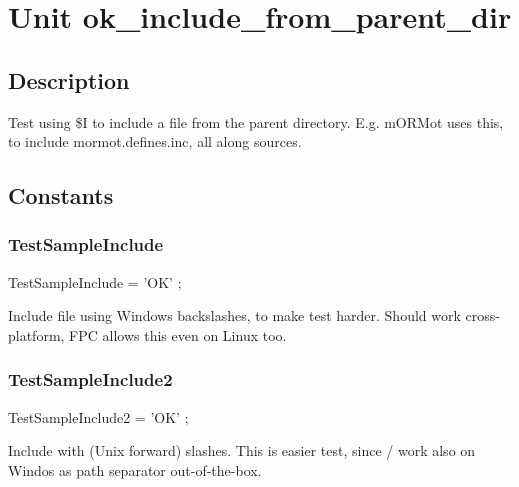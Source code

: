 \documentclass{report}
\begin{document}
\newlength{\tmplength}
\chapter{Unit ok{\_}include{\_}from{\_}parent{\_}dir}
\section{Description}
Test using {\$}I to include a file from the parent directory. E.g. mORMot uses this, to include mormot.defines.inc, all along sources.
\section{Constants}
\subsection*{TestSampleInclude}
\begin{list}{}{
\setlength{\itemindent}{0cm}
\setlength{\listparindent}{0cm}
\setlength{\leftmargin}{\evensidemargin}
\addtolength{\leftmargin}{\tmplength}
\settowidth{\labelsep}{X}
\addtolength{\leftmargin}{\labelsep}
\setlength{\labelwidth}{\tmplength}
}
\begin{flushleft}
\item[\textbf{Declaration}\hfill]
\begin{ttfamily}
TestSampleInclude =  'OK' ;\end{ttfamily}


\end{flushleft}
\par
\item[\textbf{Description}]
Include file using Windows backslashes, to make test harder. Should work cross{-}platform, FPC allows this even on Linux too.

\end{list}
\subsection*{TestSampleInclude2}
\begin{list}{}{
\setlength{\itemindent}{0cm}
\setlength{\listparindent}{0cm}
\setlength{\leftmargin}{\evensidemargin}
\addtolength{\leftmargin}{\tmplength}
\settowidth{\labelsep}{X}
\addtolength{\leftmargin}{\labelsep}
\setlength{\labelwidth}{\tmplength}
}
\begin{flushleft}
\item[\textbf{Declaration}\hfill]
\begin{ttfamily}
TestSampleInclude2 =  'OK' ;\end{ttfamily}


\end{flushleft}
\par
\item[\textbf{Description}]
Include with (Unix forward) slashes. This is easier test, since / work also on Windos as path separator out{-}of{-}the{-}box.

\end{list}
\end{document}
